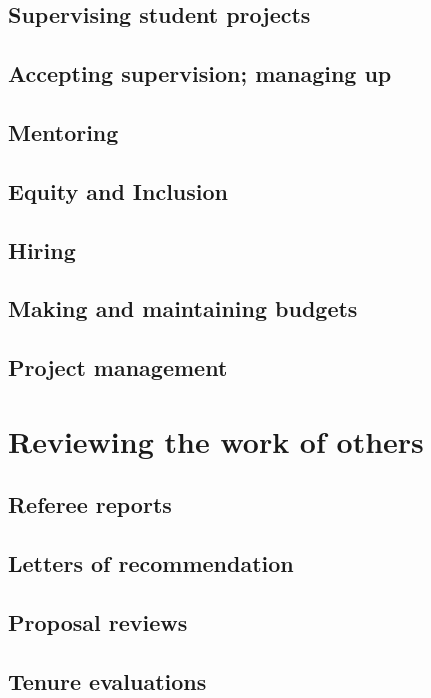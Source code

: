 \documentclass[letterpaper]{book}
\begin{document}
\chapter{Supervising student projects}

\chapter{Accepting supervision; managing up}

\chapter{Mentoring}

\chapter{Equity and Inclusion}

\chapter{Hiring}

\chapter{Making and maintaining budgets}

\chapter{Project management}

\part{Reviewing the work of others}

\chapter{Referee reports}

\chapter{Letters of recommendation}

\chapter{Proposal reviews}

\chapter{Tenure evaluations}
\end{document}
